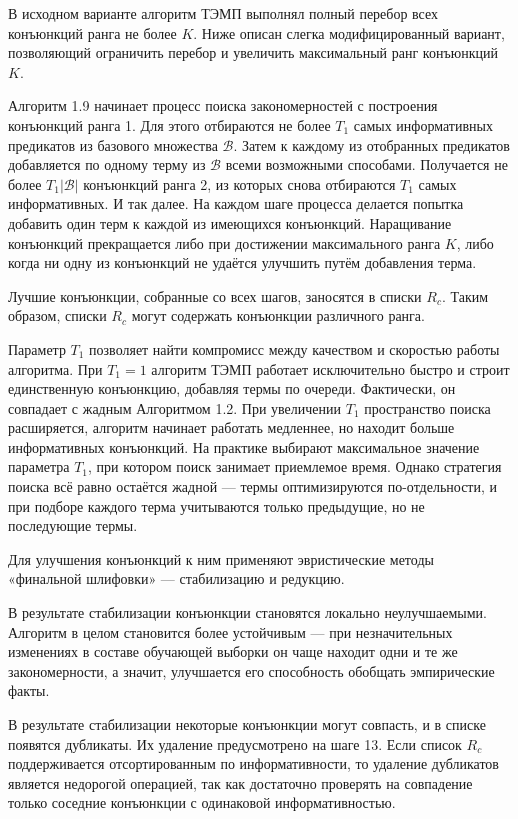 В исходном варианте алгоритм ТЭМП выполнял полный перебор всех конъюнкций ранга не более $K$. Ниже описан слегка модифицированный вариант, позволяющий ограничить перебор и увеличить максимальный ранг конъюнкций $K$.

Алгоритм 1.9 начинает процесс поиска закономерностей с построения конъюнкций ранга 1. Для этого отбираются не более $T_1$ самых информативных предикатов из базового множества $\mathcal{B}$. Затем к каждому из отобранных предикатов добавляется по одному терму из $\mathcal{B}$ всеми возможными способами. Получается не более $T_1|\mathcal{B}|$ конъюнкций ранга 2, из которых снова отбираются $T_1$ самых информативных. И так далее. На каждом шаге процесса делается попытка добавить один терм к каждой из имеющихся конъюнкций. Наращивание конъюнкций прекращается либо при достижении максимального ранга $K$, либо когда ни одну из конъюнкций не удаётся улучшить путём добавления терма.

Лучшие конъюнкции, собранные со всех шагов, заносятся в списки $R_c$. Таким образом, списки $R_c$ могут содержать конъюнкции различного ранга.

Параметр $T_1$ позволяет найти компромисс между качеством и скоростью работы алгоритма. При $T_1 = 1$ алгоритм ТЭМП работает исключительно быстро и строит единственную конъюнкцию, добавляя термы по очереди. Фактически, он совпадает с жадным Алгоритмом 1.2. При увеличении $T_1$ пространство поиска расширяется, алгоритм начинает работать медленнее, но находит больше информативных конъюнкций. На практике выбирают максимальное значение параметра $T_1$, при котором поиск занимает приемлемое время. Однако стратегия поиска всё равно остаётся жадной — термы оптимизируются по-отдельности, и при подборе каждого терма учитываются только предыдущие, но не последующие термы.

Для улучшения конъюнкций к ним применяют эвристические методы «финальной шлифовки» — стабилизацию и редукцию.

В результате стабилизации конъюнкции становятся локально неулучшаемыми. Алгоритм в целом становится более устойчивым — при незначительных изменениях в составе обучающей выборки он чаще находит одни и те же закономерности, а значит, улучшается его способность обобщать эмпирические факты.

В результате стабилизации некоторые конъюнкции могут совпасть, и в списке появятся дубликаты. Их удаление предусмотрено на шаге 13. Если список $R_c$ поддерживается отсортированным по информативности, то удаление дубликатов является недорогой операцией, так как достаточно проверять на совпадение только соседние конъюнкции с одинаковой информативностью.

